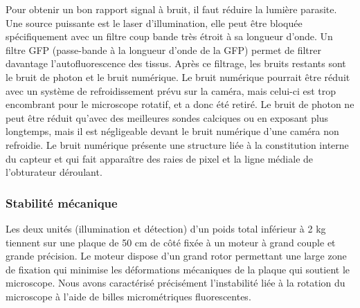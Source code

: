 Pour obtenir un bon rapport signal à bruit, il faut réduire la lumière parasite. Une source puissante est le laser d'illumination, elle peut être bloquée spécifiquement avec un filtre coup bande très étroit à sa longueur d'onde. Un filtre GFP (passe-bande à la longueur d'onde de la GFP) permet de filtrer davantage l'autofluorescence des tissus. Après ce filtrage, les bruits restants sont le bruit de photon et le bruit numérique. Le bruit numérique pourrait être réduit avec un système de refroidissement prévu sur la caméra, mais celui-ci est trop encombrant pour le microscope rotatif, et a donc été retiré. Le bruit de photon ne peut être réduit qu'avec des meilleures sondes calciques ou en exposant plus longtemps, mais il est négligeable devant le bruit numérique d'une caméra non refroidie. Le bruit numérique présente une structure liée à la constitution interne du capteur et qui fait apparaître des raies de pixel et la ligne médiale de l'obturateur déroulant.



\subsubsection{Stabilité mécanique}

Les deux unités (illumination et détection) d'un poids total inférieur à 2 kg tiennent sur une plaque de 50 cm de côté fixée à un moteur à grand couple et grande précision. Le moteur dispose d'un grand rotor permettant une large zone de fixation qui minimise les déformations mécaniques de la plaque qui soutient le microscope. Nous avons caractérisé précisément l'instabilité liée à la rotation du microscope à l'aide de billes micrométriques fluorescentes.

